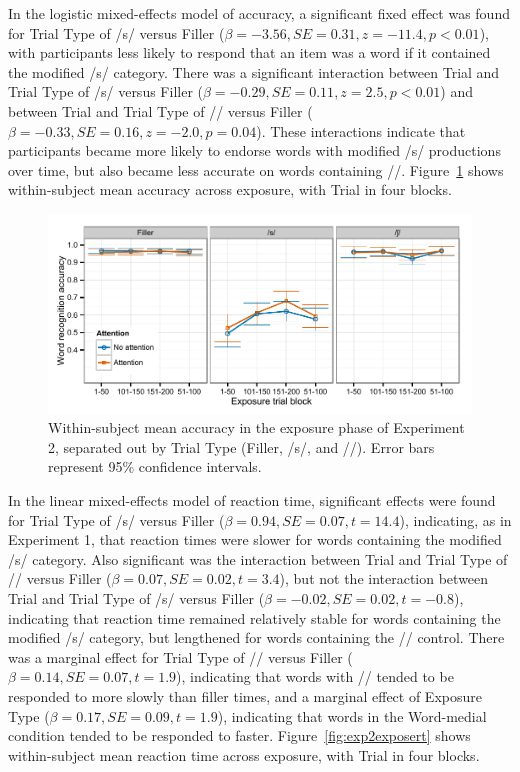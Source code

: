 In the logistic mixed-effects model of accuracy, a significant fixed effect was found for Trial Type of /s/ versus Filler ($\beta = -3.56, SE = 0.31, z = -11.4, p < 0.01$), with participants less likely to respond that an item was a word if it contained the modified /s/ category.
There was a significant interaction between Trial and Trial Type of /s/ versus Filler ($\beta = -0.29, SE = 0.11, z = 2.5, p < 0.01$) and between Trial and Trial Type of /\textesh/ versus Filler ($\beta = -0.33, SE = 0.16, z = -2.0, p = 0.04$).  
These interactions indicate that participants became more likely to endorse words with modified /s/ productions over time, but also became less accurate on words containing /\textesh/.  
Figure~\ref{fig:exp2exposeacc} shows within-subject mean accuracy across exposure, with Trial in four blocks.


\begin{figure}[!ht]
\caption{Within-subject mean accuracy in the exposure phase of Experiment 2, separated out by Trial Type (Filler, /s/, and /\textesh/). Error bars represent 95\% confidence intervals.}
\label{fig:exp2exposeacc}
\begin{center}
\includegraphics[width=\textwidth]{graphs/exp2_expacc}
\end{center}
\end{figure}

In the linear mixed-effects model of reaction time, significant effects were found for Trial Type of /s/ versus Filler ($\beta = 0.94, SE = 0.07, t = 14.4$), indicating, as in Experiment 1, that reaction times were slower for words containing the modified /s/ category.
Also significant was the interaction between Trial and Trial Type of /\textesh/ versus Filler ($\beta = 0.07, SE = 0.02, t = 3.4$), but not the interaction between Trial and Trial Type of /s/ versus Filler ($\beta = -0.02, SE = 0.02, t = -0.8$), indicating that reaction time remained relatively stable for words containing the modified /s/ category, but lengthened for words containing the /\textesh/ control.  
There was a marginal effect for Trial Type of /\textesh/ versus Filler ($\beta = 0.14, SE = 0.07, t = 1.9$), indicating that words with /\textesh/ tended to be responded to more slowly than filler times, and a marginal effect of Exposure Type ($\beta = 0.17, SE = 0.09, t = 1.9$), indicating that words in the Word-medial condition tended to be responded to faster.
Figure~\ref{fig:exp2exposert} shows within-subject mean reaction time across exposure, with Trial in four blocks.

